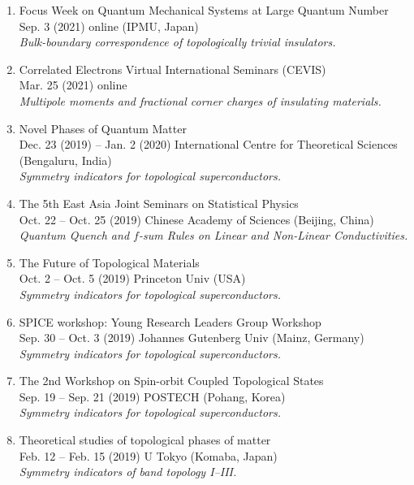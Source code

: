 \documentclass[letterpaper,11pt]{article}
\begin{document}
\begin{enumerate}
\item
Focus Week on Quantum Mechanical Systems at Large Quantum Number\\
Sep. 3 (2021) online (IPMU, Japan)\\
\emph{Bulk-boundary correspondence of topologically trivial insulators.}

\item
Correlated Electrons Virtual International Seminars (CEVIS)\\
Mar. 25 (2021) online\\
\emph{Multipole moments and fractional corner charges of insulating materials.}

\item
Novel Phases of Quantum Matter \\
Dec. 23 (2019) -- Jan. 2 (2020) International Centre for Theoretical Sciences (Bengaluru, India)\\
\emph{Symmetry indicators for topological superconductors.}


\item
The 5th East Asia Joint Seminars on Statistical Physics\\
Oct. 22 -- Oct. 25 (2019) Chinese Academy of Sciences (Beijing, China)\\
\emph{Quantum Quench and $f$-sum Rules on Linear and Non-Linear Conductivities.}

\item
The Future of Topological Materials\\
Oct. 2 -- Oct. 5 (2019) Princeton Univ (USA)\\
\emph{Symmetry indicators for topological superconductors.}

\item
SPICE workshop: Young Research Leaders Group Workshop\\
Sep. 30 -- Oct. 3 (2019) Johannes Gutenberg Univ (Mainz, Germany)\\
\emph{Symmetry indicators for topological superconductors.}

\item
The 2nd Workshop on Spin-orbit Coupled Topological States\\
Sep. 19 -- Sep. 21 (2019) POSTECH (Pohang, Korea)\\
\emph{Symmetry indicators for topological superconductors.}

\item Theoretical studies of topological phases of matter\\
Feb. 12 -- Feb. 15 (2019) U Tokyo (Komaba, Japan)\\
\emph{Symmetry indicators of band topology I--III.}


\end{enumerate}
\end{document}
